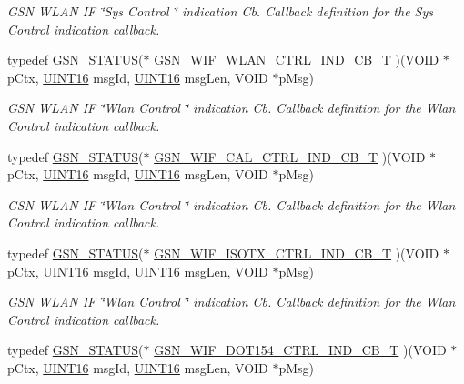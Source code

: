 \begin{DoxyCompactItemize}
\begin{DoxyCompactList}\small\item\em GSN WLAN IF \char`\"{}Sys Control \char`\"{} indication Cb. Callback definition for the Sys Control indication callback. \end{DoxyCompactList}\item 
typedef \hyperlink{a00660_gada5951904ac6110b1fa95e51a9ddc217}{GSN\_\-STATUS}($\ast$ \hyperlink{a00635_ga1a6c66e709c29a827dc0c07e40f4b9aa}{GSN\_\-WIF\_\-WLAN\_\-CTRL\_\-IND\_\-CB\_\-T} )(VOID $\ast$pCtx, \hyperlink{a00660_ga09f1a1fb2293e33483cc8d44aefb1eb1}{UINT16} msgId, \hyperlink{a00660_ga09f1a1fb2293e33483cc8d44aefb1eb1}{UINT16} msgLen, VOID $\ast$pMsg)
\begin{DoxyCompactList}\small\item\em GSN WLAN IF \char`\"{}Wlan Control \char`\"{} indication Cb. Callback definition for the Wlan Control indication callback. \end{DoxyCompactList}\item 
typedef \hyperlink{a00660_gada5951904ac6110b1fa95e51a9ddc217}{GSN\_\-STATUS}($\ast$ \hyperlink{a00635_ga713dea098107eba190695d6e868ff027}{GSN\_\-WIF\_\-CAL\_\-CTRL\_\-IND\_\-CB\_\-T} )(VOID $\ast$pCtx, \hyperlink{a00660_ga09f1a1fb2293e33483cc8d44aefb1eb1}{UINT16} msgId, \hyperlink{a00660_ga09f1a1fb2293e33483cc8d44aefb1eb1}{UINT16} msgLen, VOID $\ast$pMsg)
\begin{DoxyCompactList}\small\item\em GSN WLAN IF \char`\"{}Wlan Control \char`\"{} indication Cb. Callback definition for the Wlan Control indication callback. \end{DoxyCompactList}\item 
typedef \hyperlink{a00660_gada5951904ac6110b1fa95e51a9ddc217}{GSN\_\-STATUS}($\ast$ \hyperlink{a00635_gac721992ff2f8c904a29e80d4b2eaead3}{GSN\_\-WIF\_\-ISOTX\_\-CTRL\_\-IND\_\-CB\_\-T} )(VOID $\ast$pCtx, \hyperlink{a00660_ga09f1a1fb2293e33483cc8d44aefb1eb1}{UINT16} msgId, \hyperlink{a00660_ga09f1a1fb2293e33483cc8d44aefb1eb1}{UINT16} msgLen, VOID $\ast$pMsg)
\begin{DoxyCompactList}\small\item\em GSN WLAN IF \char`\"{}Wlan Control \char`\"{} indication Cb. Callback definition for the Wlan Control indication callback. \end{DoxyCompactList}\item 
typedef \hyperlink{a00660_gada5951904ac6110b1fa95e51a9ddc217}{GSN\_\-STATUS}($\ast$ \hyperlink{a00635_gaf83e1299bf211f7c06ff40e18f1d3ad4}{GSN\_\-WIF\_\-DOT154\_\-CTRL\_\-IND\_\-CB\_\-T} )(VOID $\ast$pCtx, \hyperlink{a00660_ga09f1a1fb2293e33483cc8d44aefb1eb1}{UINT16} msgId, \hyperlink{a00660_ga09f1a1fb2293e33483cc8d44aefb1eb1}{UINT16} msgLen, VOID $\ast$pMsg)

\end{DoxyCompactItemize}
